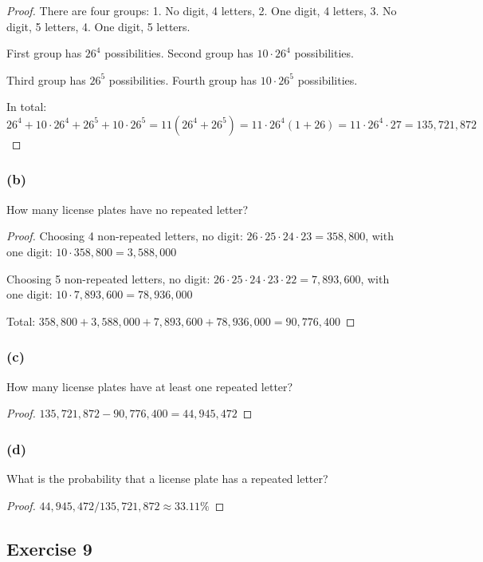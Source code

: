 \documentclass[14pt]{extarticle}
\begin{document}
\begin{proof}
There are four groups: 1. No digit, 4 letters, 2. One digit, 4 letters, 3. No digit, 5 letters, 4. One digit, 5 
letters.

First group has \(26^4\) possibilities. Second group has \(10 \cdot 26^4\) possibilities.

Third group has \(26^5\) possibilities. Fourth group has \(10 \cdot 26^5\) possibilities.

In total: \(26^4 + 10 \cdot 26^4 + 26^5 + 10 \cdot 26^5 = 11(26^4 + 26^5) = 11 \cdot 26^4 (1 + 26) = 11 \cdot 26^4 
\cdot 27 = 135,721,872\)
\end{proof}

\subsubsection{(b)}
How many license plates have no repeated letter?

\begin{proof}
Choosing 4 non-repeated letters, no digit: \(26 \cdot 25 \cdot 24 \cdot 23 = 358,800\), with one digit: \(10 \cdot 
358,800 = 3,588,000\)

Choosing 5 non-repeated letters, no digit: \(26 \cdot 25 \cdot 24 \cdot 23 \cdot 22 = 7,893,600\), with one digit:
\(10 \cdot 7,893,600 = 78,936,000\)

Total: \(358,800 + 3,588,000 + 7,893,600 + 78,936,000 = 90,776,400\)
\end{proof}

\subsubsection{(c)}
How many license plates have at least one repeated letter?

\begin{proof}
\(135,721,872 - 90,776,400 = 44,945,472\)
\end{proof}

\subsubsection{(d)}
What is the probability that a license plate has a repeated letter?

\begin{proof}
\(44,945,472 / 135,721,872 \approx 33.11\%\)
\end{proof}

\subsection{Exercise 9}
\end{document}
